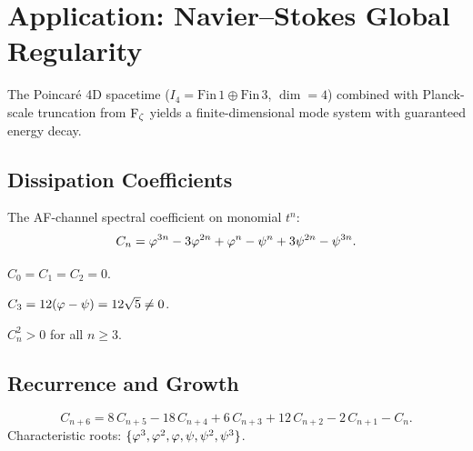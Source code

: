 \chapter{Application: Navier--Stokes Global Regularity}
\label{ch:ns}

The Poincar\'{e} 4D spacetime
($I_4 = \mathrm{Fin}\,1 \oplus \mathrm{Fin}\,3$, $\dim = 4$)
combined with Planck-scale truncation from $\operatorname{F_\zeta}$
yields a finite-dimensional mode system with guaranteed energy decay.

\section{Dissipation Coefficients}

\begin{definition}
\label{def:dissipation-coeff}
The AF-channel spectral coefficient on monomial $t^n$:
\[
  C_n = \varphi^{3n} - 3\varphi^{2n} + \varphi^n - \psi^n + 3\psi^{2n} - \psi^{3n}.
\]
\end{definition}

\begin{theorem}
\label{thm:kernel-modes}
$C_0 = C_1 = C_2 = 0$.
\end{theorem}

\begin{theorem}
\label{thm:dissipation-onset}
$C_3 = 12(\varphi - \psi) = 12\sqrt5 \ne 0$.
\end{theorem}

\begin{theorem}
\label{thm:dissipation-positive}
$C_n^2 > 0$ for all $n \ge 3$.
\end{theorem}

\section{Recurrence and Growth}

\begin{theorem}
\label{thm:dissipation-recurrence}
\[
  C_{n+6} = 8\,C_{n+5} - 18\,C_{n+4} + 6\,C_{n+3} + 12\,C_{n+2} - 2\,C_{n+1} - C_n.
\]
Characteristic roots: $\{\varphi^3, \varphi^2, \varphi, \psi, \psi^2, \psi^3\}$.
\end{theorem}

